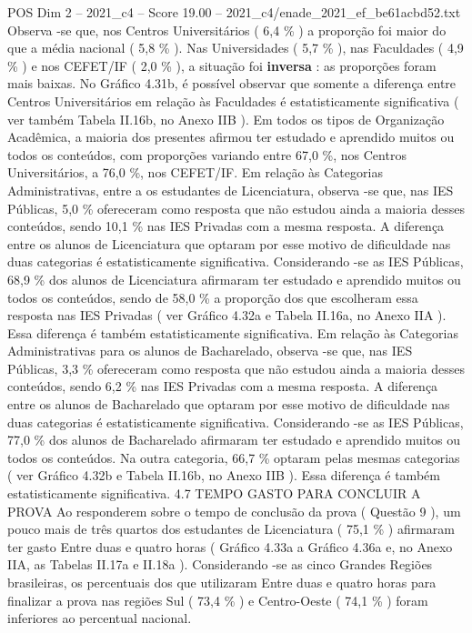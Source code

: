 \begin{textsample}{POS Dim 2 – 2021\_c4 – Score 19.00 – 2021\_c4/enade\_2021\_ef\_be61acbd52.txt}
Observa -se que, nos Centros Universitários ( 6,4 \% ) a proporção foi maior do que a média nacional ( 5,8 \% ).
Nas Universidades ( 5,7 \% ), nas Faculdades ( 4,9 \% ) e nos CEFET/IF ( 2,0 \% ), a situação foi \textbf{inversa} : as proporções foram mais baixas.
No Gráfico 4.31b, é possível observar que somente a diferença entre Centros Universitários em relação às Faculdades é estatisticamente significativa ( ver também Tabela II.16b, no Anexo IIB ).
Em todos os tipos de Organização Acadêmica, a maioria dos presentes afirmou ter estudado e aprendido muitos ou todos os conteúdos, com proporções variando entre 67,0 \%, nos Centros Universitários, a 76,0 \%, nos CEFET/IF.
Em relação às Categorias Administrativas, entre a os estudantes de Licenciatura, observa -se que, nas IES Públicas, 5,0 \% ofereceram como resposta que não estudou ainda a maioria desses conteúdos, sendo 10,1 \% nas IES Privadas com a mesma resposta.
A diferença entre os alunos de Licenciatura que optaram por esse motivo de dificuldade nas duas categorias é estatisticamente significativa.
Considerando -se as IES Públicas, 68,9 \% dos alunos de Licenciatura afirmaram ter estudado e aprendido muitos ou todos os conteúdos, sendo de 58,0 \% a proporção dos que escolheram essa resposta nas IES Privadas ( ver Gráfico 4.32a e Tabela II.16a, no Anexo IIA ).
Essa diferença é também estatisticamente significativa.
Em relação às Categorias Administrativas para os alunos de Bacharelado, observa -se que, nas IES Públicas, 3,3 \% ofereceram como resposta que não estudou ainda a maioria desses conteúdos, sendo 6,2 \% nas IES Privadas com a mesma resposta.
A diferença entre os alunos de Bacharelado que optaram por esse motivo de dificuldade nas duas categorias é estatisticamente significativa.
Considerando -se as IES Públicas, 77,0 \% dos alunos de Bacharelado afirmaram ter estudado e aprendido muitos ou todos os conteúdos.
Na outra categoria, 66,7 \% optaram pelas mesmas categorias ( ver Gráfico 4.32b e Tabela II.16b, no Anexo IIB ).
Essa diferença é também estatisticamente significativa. 4.7 TEMPO GASTO PARA CONCLUIR A PROVA Ao responderem sobre o tempo de conclusão da prova ( Questão 9 ), um pouco mais de três quartos dos estudantes de Licenciatura ( 75,1 \% ) afirmaram ter gasto Entre duas e quatro horas ( Gráfico 4.33a a Gráfico 4.36a e, no Anexo IIA, as Tabelas II.17a e II.18a ).
Considerando -se as cinco Grandes Regiões brasileiras, os percentuais dos que utilizaram Entre duas e quatro horas para finalizar a prova nas regiões Sul ( 73,4 \% ) e Centro-Oeste ( 74,1 \% ) foram inferiores ao percentual nacional.

\end{textsample}
